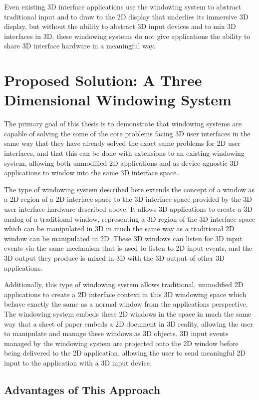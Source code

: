 Even existing 3D interface applications use the windowing system to abstract traditional input and to draw to the 2D display that underlies its immersive 3D display, but without the ability to abstract 3D input devices and to mix 3D interfaces in 3D, these windowing systems do not give applications the ability to share 3D interface hardware in a meaningful way.

\section{Proposed Solution: A Three Dimensional Windowing System}

The primary goal of this thesis is to demonstrate that windowing systems are capable of solving the some of the core problems facing 3D user interfaces in the same way that they have already solved the exact same problems for 2D user interfaces, and that this can be done with extensions to an existing windowing system, allowing both unmodified 2D applications and as device-agnostic 3D applications to window into the same 3D interface space. 

The type of windowing system described here extends the concept of a window as a 2D region of a 2D interface space to the 3D interface space provided by the 3D user interface hardware described above. It allows 3D applications to create a 3D analog of a traditional window, representing a 3D region of the 3D interface space which can be manipulated in 3D in much the same way as a traditional 2D window can be manipulated in 2D. These 3D windows can listen for 3D input events via the same mechanism that is used to listen to 2D input events, and the 3D output they produce is mixed in 3D with the 3D output of other 3D applications.

Additionally, this type of windowing system allows traditional, unmodified 2D applications to create a 2D interface context in this 3D windowing space which behave exactly the same as a normal window from the applications perspective. The windowing system embeds these 2D windows in the space in much the same way that a sheet of paper embeds a 2D document in 3D reality, allowing the user to manipulate and manage these windows as 3D objects. 3D input events managed by the windowing system are projected onto the 2D window before being delivered to the 2D application, allowing the user to send meaningful 2D input to the application with a 3D input device.

\subsection{Advantages of This Approach}

